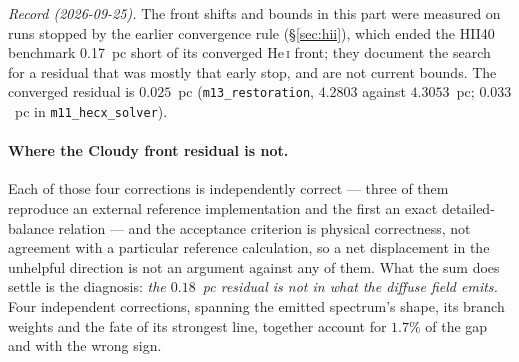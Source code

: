\documentclass[english,a4paper]{my_memo}
\newcommand{\code}[1]{\texttt{#1}}
\begin{document}
\emph{Record (2026-09-25).}  The front shifts and bounds in this part were
measured on runs stopped by the earlier convergence rule (\S\ref{sec:hii}),
which ended the HII40 benchmark 0.17~pc short of its converged He\,\textsc{i}
front; they document the search for a residual that was mostly that early
stop, and are not current bounds.  The converged residual is $0.025$~pc
(\code{m13\_restoration}, $4.2803$ against $4.3053$~pc; $0.033$~pc in
\code{m11\_hecx\_solver}).

\paragraph{Where the Cloudy front residual is not.}  Each of those four
corrections is independently correct --- three of them reproduce an external
reference implementation and the first an exact detailed-balance relation ---
and the acceptance criterion is physical correctness, not agreement with a
particular reference calculation, so a net displacement in the unhelpful
direction is not an argument against any of them.  What the sum does settle
is the diagnosis: \emph{the $0.18$~pc residual is not in what the diffuse
field emits.}  Four independent corrections, spanning the emitted spectrum's
shape, its branch weights and the fate of its strongest line, together
account for $1.7\%$ of the gap and with the wrong sign.
\end{document}
